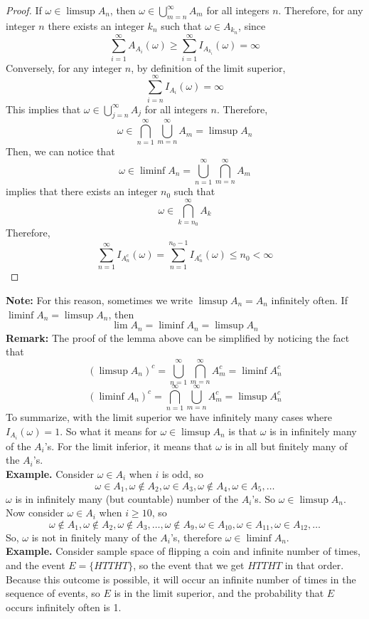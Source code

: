 \documentclass[openany]{report}
\begin{document}
\begin{proof}
    If $\omega \in \limsup A_n$, then $\omega \in \bigcup\limits_{m=n}^\infty A_m$ for all integers $n$. Therefore, for any integer $n$ there exists an integer $k_n$ such that $\omega \in A_{k_n}$, since 
    \[\sum_{i=1}^\infty A_{A_i} (\omega) \geq \sum_{i=1}^\infty I_{A_{k_i}}(\omega) = \infty\]
    Conversely, for any integer $n$, by definition of the limit superior, 
    \[\sum_{i=n}^\infty I_{A_i}(\omega) = \infty\]
    This implies that $\omega \in \bigcup\limits_{j=n}^\infty A_j$ for all integers $n$. Therefore, 
    \[\omega \in \bigcap_{n=1}^\infty \bigcup_{m=n}^\infty A_m = \limsup A_n\]
    Then, we can notice that 
    \[\omega \in \liminf A_n = \bigcup_{n=1}^\infty \bigcap_{m=n}^\infty A_m \]
    implies that there exists an integer $n_0$ such that 
    \[\omega \in \bigcap_{k=n_0}^\infty A_k\]
    Therefore, 
    \[\sum_{n=1}^\infty I_{A_n^c} (\omega) = \sum_{n=1}^{n_0-1} I_{A_n^c} (\omega) \leq n_0 < \infty\]

\end{proof}
\textbf{Note:} For this reason, sometimes we write $\limsup A_n = A_n$ infinitely often. If $\liminf A_n = \limsup A_n$, then 
\[\lim A_n = \liminf A_n = \limsup A_n\]
\textbf{Remark:} The proof of the lemma above can be simplified by noticing the fact that 
\[(\limsup A_n)^c = \bigcup_{n=1}^\infty \bigcap_{m=n}^\infty A_m^c = \liminf A_n^c\]
\[(\liminf A_n)^c = \bigcap_{n=1}^\infty \bigcup_{m=n}^\infty A_m^c = \limsup A_n^c\]
To summarize, with the limit superior we have infinitely many cases where $I_{A_i}(\omega) = 1$. So what it means for $\omega \in \limsup A_n$ is that $\omega$ is in infinitely many of the $A_i$'s. For the limit inferior, it means that $\omega$ is in all but finitely many of the $A_i$'s.\\[2ex]
\noindent
\textbf{Example.}
Consider $\omega \in A_i$ when $i$ is odd, so 
\[\omega \in A_1, \omega \not\in A_2, \omega \in A_3, \omega \not\in A_4, \omega \in A_5, \ldots\]
$\omega$ is in infinitely many (but countable) number of the $A_i$'s. So $\omega \in \limsup A_n$. Now consider $\omega \in A_i$ when $i \geq 10$, so 
\[\omega \not\in A_1, \omega \not\in A_2, \omega \not\in A_3, \ldots, \omega \not\in A_9, \omega \in A_{10}, \omega \in A_{11}, \omega \in A_{12}, \ldots\]
So, $\omega$ is not in finitely many of the $A_i$'s, therefore $\omega \in \liminf A_n$.\\[2ex]
\noindent
\textbf{Example.} Consider sample space of flipping a coin and infinite number of times, and the event $E = \{HTTHT\}$, so the event that we get $HTTHT$ in that order. Because this outcome is possible, it will occur an infinite number of times in the sequence of events, so $E$ is in the limit superior, and the probability that $E$ occurs infinitely often is 1.
\end{document}
